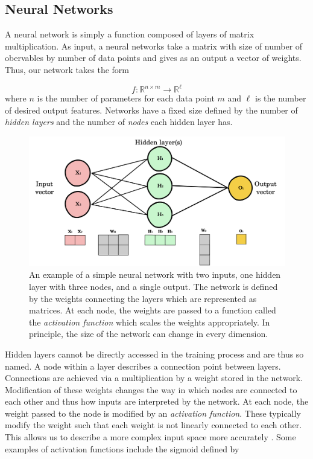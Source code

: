 \documentclass{CUP-JNL-DTM}%
\theoremstyle{definition}
\numberwithin{equation}{section}
\begin{document}
\subsection{Neural Networks}

A neural network is simply a function composed of layers of matrix multiplication. As input, a neural networks take a matrix with size of number of obervables by number of data points and gives as an output a vector of weights. Thus, our network takes the form

\begin{equation}
    f : \mathbb{R}^{n\times m} \rightarrow \mathbb{R}^{\ell}
\end{equation}
where $n$ is the number of parameters for each data point $m$ and $\ell$ is the number of desired output features. Networks have a fixed size defined by the number of \emph{hidden layers} and the number of \emph{nodes} each hidden layer has. 

\begin{figure}
\centering
\includegraphics[width=0.7\linewidth]{figures/NN_example.png}
\caption{An example of a simple neural network with two inputs, one hidden layer with three nodes, and a single output. The network is defined by the weights connecting the layers which are represented as matrices. At each node, the weights are passed to a function called the \emph{activation function} which scales the weights appropriately. In principle, the size of the network can change in every dimension. }
\label{fig:NNexample}
\end{figure}

Hidden layers cannot be directly accessed in the training process and are thus so named. A node within a layer describes a connection point between layers. Connections are achieved via a multiplication by a weight stored in the network. Modification of these weights changes the way in which nodes are connected to each other and thus how inputs are interpreted by the network. At each node, the weight passed to the node is modified by an \emph{activation function}. These typically modify the weight such that each weight is not linearly connected to each other. This allows us to describe a more complex input space more accurately \cite{dubeyActivationFunctionsDeep2022}. Some examples of activation functions include the sigmoid defined by 
\end{document}
